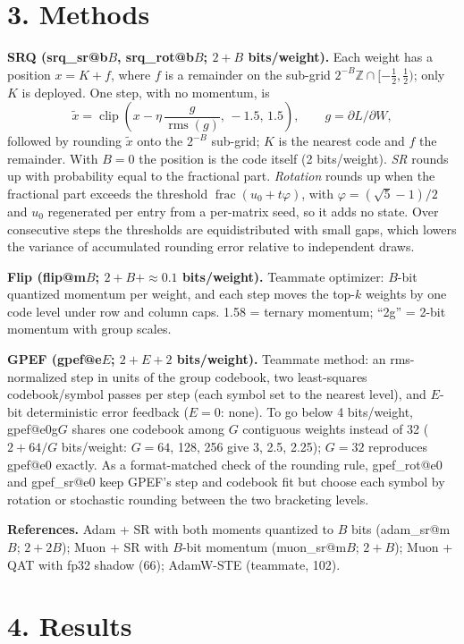 \documentclass[11pt,letterpaper]{article}
\begin{document}
\section*{3. Methods}

\textbf{SRQ (srq\_sr@b$B$, srq\_rot@b$B$; $2+B$ bits/weight).} Each weight has a position $x=K+f$, where $f$ is a
remainder on the sub-grid $2^{-B}\mathbb Z\cap[-\tfrac12,\tfrac12)$; only $K$ is deployed. One step, with no
momentum, is
\[
\tilde x=\operatorname{clip}\!\left(x-\eta\,\frac{g}{\operatorname{rms}(g)},\,-1.5,\,1.5\right),
\qquad g=\partial L/\partial W,
\]
followed by rounding $\tilde x$ onto the $2^{-B}$ sub-grid; $K$ is the nearest code and $f$ the remainder. With
$B=0$ the position is the code itself (2 bits/weight). \emph{SR} rounds up with probability equal to the fractional
part. \emph{Rotation} rounds up when the fractional part exceeds the threshold $\operatorname{frac}(u_0+t\varphi)$,
with $\varphi=(\sqrt5-1)/2$ and $u_0$ regenerated per entry from a per-matrix seed, so it adds no state. Over
consecutive steps the thresholds are equidistributed with small gaps, which lowers the variance of accumulated
rounding error relative to independent draws.

\textbf{Flip (flip@m$B$; $2+B+\approx0.1$ bits/weight).} Teammate optimizer: $B$-bit quantized momentum per
weight, and each step moves the top-$k$ weights by one code level under row and column caps. 1.58 = ternary
momentum; ``2g'' = 2-bit momentum with group scales.

\textbf{GPEF (gpef@e$E$; $2+E+2$ bits/weight).} Teammate method: an rms-normalized step in units of the group
codebook, two least-squares codebook/symbol passes per step (each symbol set to the nearest level), and $E$-bit
deterministic error feedback ($E=0$: none). To go below 4 bits/weight, gpef@e0g$G$ shares one codebook among $G$
contiguous weights instead of 32 ($2+64/G$ bits/weight: $G=64$, 128, 256 give 3, 2.5, 2.25); $G=32$ reproduces
gpef@e0 exactly. As a format-matched check of the rounding rule, gpef\_rot@e0 and gpef\_sr@e0 keep GPEF's step and
codebook fit but choose each symbol by rotation or stochastic rounding between the two bracketing levels.

\textbf{References.} Adam + SR with both moments quantized to $B$ bits (adam\_sr@m$B$; $2+2B$); Muon + SR with
$B$-bit momentum (muon\_sr@m$B$; $2+B$); Muon + QAT with fp32 shadow (66); AdamW-STE (teammate, 102).

\section*{4. Results}
\end{document}
